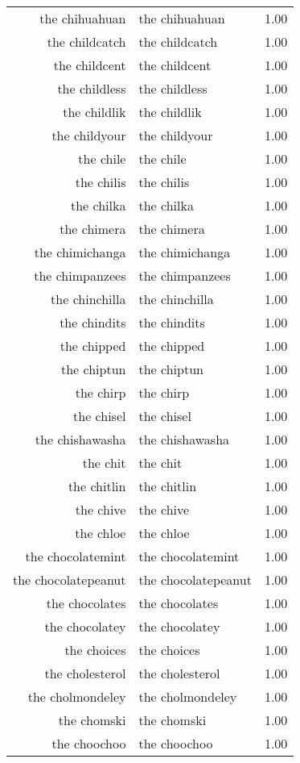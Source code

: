 \begin{table}[ht]
\begin{tabular}{rlr}
  the chihuahuan & the chihuahuan & 1.00 \\ 
  the childcatch & the childcatch & 1.00 \\ 
  the childcent & the childcent & 1.00 \\ 
  the childless & the childless & 1.00 \\ 
  the childlik & the childlik & 1.00 \\ 
  the childyour & the childyour & 1.00 \\ 
  the chile & the chile & 1.00 \\ 
  the chilis & the chilis & 1.00 \\ 
  the chilka & the chilka & 1.00 \\ 
  the chimera & the chimera & 1.00 \\ 
  the chimichanga & the chimichanga & 1.00 \\ 
  the chimpanzees & the chimpanzees & 1.00 \\ 
  the chinchilla & the chinchilla & 1.00 \\ 
  the chindits & the chindits & 1.00 \\ 
  the chipped & the chipped & 1.00 \\ 
  the chiptun & the chiptun & 1.00 \\ 
  the chirp & the chirp & 1.00 \\ 
  the chisel & the chisel & 1.00 \\ 
  the chishawasha & the chishawasha & 1.00 \\ 
  the chit & the chit & 1.00 \\ 
  the chitlin & the chitlin & 1.00 \\ 
  the chive & the chive & 1.00 \\ 
  the chloe & the chloe & 1.00 \\ 
  the chocolatemint & the chocolatemint & 1.00 \\ 
  the chocolatepeanut & the chocolatepeanut & 1.00 \\ 
  the chocolates & the chocolates & 1.00 \\ 
  the chocolatey & the chocolatey & 1.00 \\ 
  the choices & the choices & 1.00 \\ 
  the cholesterol & the cholesterol & 1.00 \\ 
  the cholmondeley & the cholmondeley & 1.00 \\ 
  the chomski & the chomski & 1.00 \\ 
  the choochoo & the choochoo & 1.00 \\ 

\end{tabular}
\end{table}
